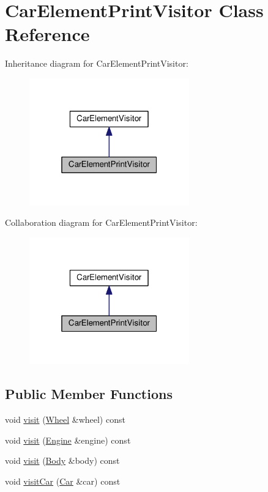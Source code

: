 \hypertarget{classCarElementPrintVisitor}{}\section{Car\+Element\+Print\+Visitor Class Reference}
\label{classCarElementPrintVisitor}


Inheritance diagram for Car\+Element\+Print\+Visitor\+:
\nopagebreak
\begin{figure}[H]
\begin{center}
\leavevmode
\includegraphics[width=196pt]{classCarElementPrintVisitor__inherit__graph}
\end{center}
\end{figure}


Collaboration diagram for Car\+Element\+Print\+Visitor\+:
\nopagebreak
\begin{figure}[H]
\begin{center}
\leavevmode
\includegraphics[width=196pt]{classCarElementPrintVisitor__coll__graph}
\end{center}
\end{figure}
\subsection*{Public Member Functions}
\begin{DoxyCompactItemize}
\item 
void \hyperlink{classCarElementPrintVisitor_a9677cd2f8d34aaf2a878ff1504e49c33}{visit} (\hyperlink{classWheel}{Wheel} \&wheel) const 
\item 
void \hyperlink{classCarElementPrintVisitor_afb71a1c5b2d6625bf569366f5903d531}{visit} (\hyperlink{classEngine}{Engine} \&engine) const 
\item 
void \hyperlink{classCarElementPrintVisitor_a4ad0bbfd79baaedfb2ee07c9e52d8f21}{visit} (\hyperlink{classBody}{Body} \&body) const 
\item 
void \hyperlink{classCarElementPrintVisitor_a99cb1306db917e1980d3f8c414acbc93}{visit\+Car} (\hyperlink{classCar}{Car} \&car) const 
\end{DoxyCompactItemize}


